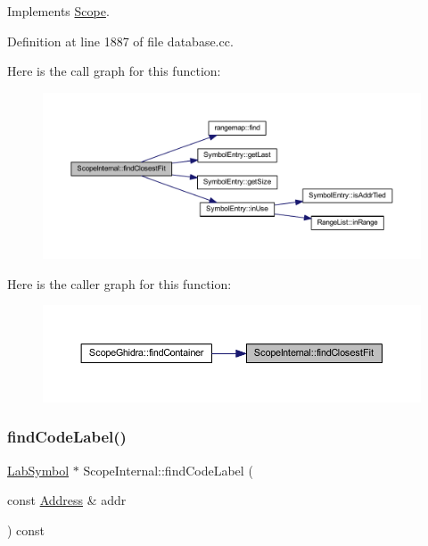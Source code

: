 Implements \mbox{\hyperlink{class_scope_ab679fe786be2fb949af78054cb2041a8}{Scope}}.



Definition at line 1887 of file database.\+cc.

Here is the call graph for this function\+:
\nopagebreak
\begin{figure}[H]
\begin{center}
\leavevmode
\includegraphics[width=350pt]{class_scope_internal_a27135ecccccc6784b292a354d6801289_cgraph}
\end{center}
\end{figure}
Here is the caller graph for this function\+:
\nopagebreak
\begin{figure}[H]
\begin{center}
\leavevmode
\includegraphics[width=350pt]{class_scope_internal_a27135ecccccc6784b292a354d6801289_icgraph}
\end{center}
\end{figure}
\mbox{\label{class_scope_internal_a602029280a3bc0dac8aac016ec934d5b}} 
\subsubsection{\texorpdfstring{findCodeLabel()}{findCodeLabel()}}
{\footnotesize\ttfamily \mbox{\hyperlink{class_lab_symbol}{Lab\+Symbol}} $\ast$ Scope\+Internal\+::find\+Code\+Label (\begin{DoxyParamCaption}\item[{const \mbox{\hyperlink{class_address}{Address}} \&}]{addr }\end{DoxyParamCaption}) const\hspace{0.3cm}{\ttfamily [virtual]}}



